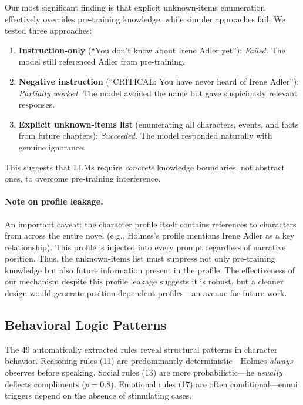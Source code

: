 \documentclass[11pt,a4paper]{article}
\begin{document}
Our most significant finding is that explicit unknown-items enumeration effectively overrides pre-training knowledge, while simpler approaches fail.
We tested three approaches:

\begin{enumerate}
\setlength\itemsep{0pt}
\item \textbf{Instruction-only} (``You don't know about Irene Adler yet''): \textit{Failed.} The model still referenced Adler from pre-training.
\item \textbf{Negative instruction} (``CRITICAL: You have never heard of Irene Adler''): \textit{Partially worked.} The model avoided the name but gave suspiciously relevant responses.
\item \textbf{Explicit unknown-items list} (enumerating all characters, events, and facts from future chapters): \textit{Succeeded.} The model responded naturally with genuine ignorance.
\end{enumerate}

This suggests that LLMs require \textit{concrete} knowledge boundaries, not abstract ones, to overcome pre-training interference.

\paragraph{Note on profile leakage.}
An important caveat: the character profile itself contains references to characters from across the entire novel (e.g., Holmes's profile mentions Irene Adler as a key relationship).
This profile is injected into every prompt regardless of narrative position.
Thus, the unknown-items list must suppress not only pre-training knowledge but also future information present in the profile.
The effectiveness of our mechanism despite this profile leakage suggests it is robust, but a cleaner design would generate position-dependent profiles---an avenue for future work.

\subsection{Behavioral Logic Patterns}
\label{sec:logic-patterns}

The 49 automatically extracted rules reveal structural patterns in character behavior.
Reasoning rules (11) are predominantly deterministic---Holmes \textit{always} observes before speaking.
Social rules (13) are more probabilistic---he \textit{usually} deflects compliments ($p=0.8$).
Emotional rules (17) are often conditional---ennui triggers depend on the absence of stimulating cases.
\end{document}
